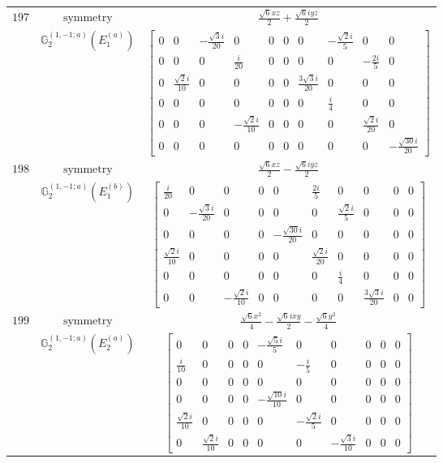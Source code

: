 \documentclass[fleqn,8pt,landscape]{jsarticle}
\begin{document}
\begin{longtable}{ccc}
$ 197 $ & $ \text{symmetry} $ & $ \frac{\sqrt{6} x z}{2} + \frac{\sqrt{6} i y z}{2} $ \\
$  $ & $ \mathbb{G}_{2}^{(1,-1;a)}(E_{1}^{(a)}) $ & $ \begin{bmatrix} 0 & 0 & - \frac{\sqrt{3} i}{20} & 0 & 0 & 0 & 0 & - \frac{\sqrt{2} i}{5} & 0 & 0 \\ 0 & 0 & 0 & \frac{i}{20} & 0 & 0 & 0 & 0 & - \frac{2 i}{5} & 0 \\ 0 & \frac{\sqrt{2} i}{10} & 0 & 0 & 0 & 0 & \frac{3 \sqrt{3} i}{20} & 0 & 0 & 0 \\ 0 & 0 & 0 & 0 & 0 & 0 & 0 & \frac{i}{4} & 0 & 0 \\ 0 & 0 & 0 & - \frac{\sqrt{2} i}{10} & 0 & 0 & 0 & 0 & \frac{\sqrt{2} i}{20} & 0 \\ 0 & 0 & 0 & 0 & 0 & 0 & 0 & 0 & 0 & - \frac{\sqrt{30} i}{20} \end{bmatrix} $ \\ \hline
$ 198 $ & $ \text{symmetry} $ & $ \frac{\sqrt{6} x z}{2} - \frac{\sqrt{6} i y z}{2} $ \\
$  $ & $ \mathbb{G}_{2}^{(1,-1;a)}(E_{1}^{(b)}) $ & $ \begin{bmatrix} \frac{i}{20} & 0 & 0 & 0 & 0 & \frac{2 i}{5} & 0 & 0 & 0 & 0 \\ 0 & - \frac{\sqrt{3} i}{20} & 0 & 0 & 0 & 0 & \frac{\sqrt{2} i}{5} & 0 & 0 & 0 \\ 0 & 0 & 0 & 0 & - \frac{\sqrt{30} i}{20} & 0 & 0 & 0 & 0 & 0 \\ \frac{\sqrt{2} i}{10} & 0 & 0 & 0 & 0 & \frac{\sqrt{2} i}{20} & 0 & 0 & 0 & 0 \\ 0 & 0 & 0 & 0 & 0 & 0 & \frac{i}{4} & 0 & 0 & 0 \\ 0 & 0 & - \frac{\sqrt{2} i}{10} & 0 & 0 & 0 & 0 & \frac{3 \sqrt{3} i}{20} & 0 & 0 \end{bmatrix} $ \\ \hline
$ 199 $ & $ \text{symmetry} $ & $ \frac{\sqrt{6} x^{2}}{4} - \frac{\sqrt{6} i x y}{2} - \frac{\sqrt{6} y^{2}}{4} $ \\
$  $ & $ \mathbb{G}_{2}^{(1,-1;a)}(E_{2}^{(a)}) $ & $ \begin{bmatrix} 0 & 0 & 0 & 0 & - \frac{\sqrt{5} i}{5} & 0 & 0 & 0 & 0 & 0 \\ \frac{i}{10} & 0 & 0 & 0 & 0 & - \frac{i}{5} & 0 & 0 & 0 & 0 \\ 0 & 0 & 0 & 0 & 0 & 0 & 0 & 0 & 0 & 0 \\ 0 & 0 & 0 & 0 & - \frac{\sqrt{10} i}{10} & 0 & 0 & 0 & 0 & 0 \\ \frac{\sqrt{2} i}{10} & 0 & 0 & 0 & 0 & - \frac{\sqrt{2} i}{5} & 0 & 0 & 0 & 0 \\ 0 & \frac{\sqrt{2} i}{10} & 0 & 0 & 0 & 0 & - \frac{\sqrt{3} i}{10} & 0 & 0 & 0 \end{bmatrix} $ \\ \hline

\end{longtable}
\end{document}
